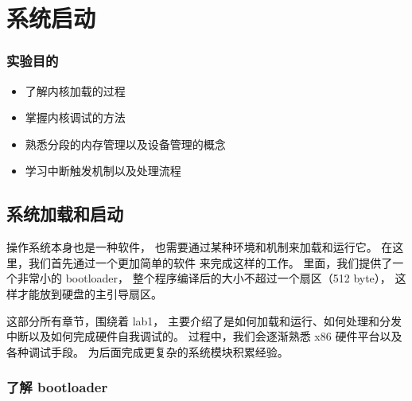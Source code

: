 \part{系统启动}

\section*{\HandRight\hspace{0.5em}实验目的}
\begin{minipage}[t]{0.8\textwidth}
\begin{heiti}
\begin{itemize}
\renewcommand\labelitemi{\FiveStarShadow}
    \item \begin{large} 了解内核加载的过程 \end{large}
    \item \begin{large} 掌握内核调试的方法 \end{large}
    \item \begin{large} 熟悉分段的内存管理以及设备管理的概念 \end{large}
    \item \begin{large} 学习中断触发机制以及处理流程 \end{large}
\end{itemize}
\end{heiti}
\end{minipage}

\chapter{系统加载和启动}

操作系统本身也是一种软件，
也需要通过某种环境和机制来加载和运行它。
在这里，我们首先通过一个更加简单的软件  来完成这样的工作。
\ucore 里面，我们提供了一个非常小的 bootloader，
整个程序编译后的大小不超过一个扇区（512 byte），
这样才能放到硬盘的主引导扇区。

这部分所有章节，围绕着 lab1，
主要介绍了\ucore 是如何加载和运行、如何处理和分发中断以及如何完成硬件自我调试的。
过程中，我们会逐渐熟悉 x86 硬件平台以及各种调试手段。
为后面完成更复杂的系统模块积累经验。

\section{了解 bootloader}


